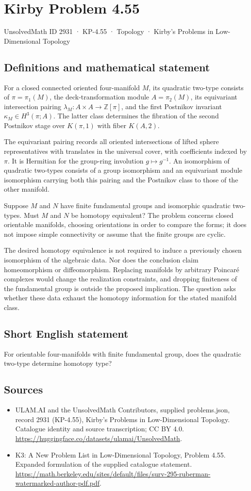 \documentclass[11pt,a4paper]{article}
\begin{document}
\section*{Kirby Problem 4.55}\label{2931}
{\small UnsolvedMath ID 2931 · KP-4.55 · Topology · Kirby's Problems in Low-Dimensional Topology}
\subsection{Definitions and mathematical statement}
For a closed connected oriented four-manifold $M$, its quadratic two-type consists of $\pi=\pi_1(M)$, the deck-transformation module $A=\pi_2(M)$, its equivariant intersection pairing $\lambda_M:A\times A\to\mathbb Z[\pi]$, and the first Postnikov invariant $\kappa_M\in H^3(\pi;A)$. The latter class determines the fibration of the second Postnikov stage over $K(\pi,1)$ with fiber $K(A,2)$.

The equivariant pairing records all oriented intersections of lifted sphere representatives with translates in the universal cover, with coefficients indexed by $\pi$. It is Hermitian for the group-ring involution $g\mapsto g^{-1}$. An isomorphism of quadratic two-types consists of a group isomorphism and an equivariant module isomorphism carrying both this pairing and the Postnikov class to those of the other manifold.

Suppose $M$ and $N$ have finite fundamental groups and isomorphic quadratic two-types. Must $M$ and $N$ be homotopy equivalent? The problem concerns closed orientable manifolds, choosing orientations in order to compare the forms; it does not impose simple connectivity or assume that the finite groups are cyclic.

The desired homotopy equivalence is not required to induce a previously chosen isomorphism of the algebraic data. Nor does the conclusion claim homeomorphism or diffeomorphism. Replacing manifolds by arbitrary Poincaré complexes would change the realization constraints, and dropping finiteness of the fundamental group is outside the proposed implication. The question asks whether these data exhaust the homotopy information for the stated manifold class.
\subsection{Short English statement}
For orientable four-manifolds with finite fundamental group, does the quadratic two-type determine homotopy type?
\subsection{Sources}
\begin{itemize}
\item[S1] ULAM.AI and the UnsolvedMath Contributors, supplied problems.json, record 2931 (KP-4.55), Kirby's Problems in Low-Dimensional Topology. Catalogue identity and source transcription; CC BY 4.0.
\url{https://huggingface.co/datasets/ulamai/UnsolvedMath}.
\item[S2] K3: A New Problem List in Low-Dimensional Topology, Problem 4.55. Expanded formulation of the supplied catalogue statement.
\url{https://math.berkeley.edu/sites/default/files/surv-295-ruberman-watermarked-author-pdf.pdf}.
\end{itemize}
\end{document}
